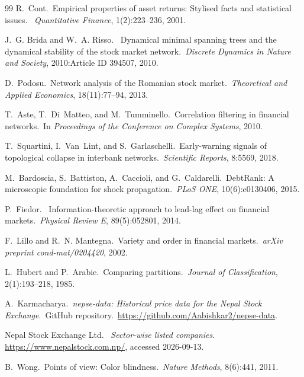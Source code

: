 \documentclass[11pt,a4paper]{article}
\theoremstyle{definition}
\begin{document}
\begin{thebibliography}{99}
 R.~Cont.\ \newblock Empirical properties of
asset returns: Stylised facts and statistical issues.\ \newblock
\emph{Quantitative Finance}, 1(2):223--236, 2001.

 J.~G. Brida and W.~A. Risso.\ \newblock
Dynamical minimal spanning trees and the dynamical stability of the
stock market network.\ \newblock \emph{Discrete Dynamics in Nature
and Society}, 2010:Article ID 394507, 2010.

 D.~Podosu.\ \newblock Network analysis of
the Romanian stock market.\ \newblock \emph{Theoretical and Applied
Economics}, 18(11):77--94, 2013.

 T.~Aste, T.~Di~Matteo, and M.~Tumminello.\
\newblock Correlation filtering in financial networks.\ \newblock In
\emph{Proceedings of the Conference on Complex Systems}, 2010.

 T.~Squartini, I.~Van~\hbox{Lint}, and
S.~Garlaschelli.\ \newblock Early-warning signals of topological
collapse in interbank networks.\ \newblock \emph{Scientific Reports},
8:5569, 2018.

 M.~Bardoscia, S.~Battiston, A.~Caccioli,
and G.~Caldarelli.\ \newblock DebtRank: A microscopic foundation for
shock propagation.\ \newblock \emph{PLoS ONE}, 10(6):e0130406, 2015.

 P.~Fiedor.\ \newblock
Information-theoretic approach to lead-lag effect on financial
markets.\ \newblock \emph{Physical Review E}, 89(5):052801, 2014.

 F.~Lillo and R.~N. Mantegna.\
\newblock Variety and order in financial markets.\ \newblock \emph{arXiv
preprint cond-mat/0204420}, 2002.

 L.~Hubert and P.~Arabie.\ \newblock Comparing
partitions.\ \newblock \emph{Journal of Classification},
2(1):193--218, 1985.

 A.~Karmacharya.\ \newblock \emph{nepse-data:
Historical price data for the Nepal Stock Exchange}.\ \newblock GitHub
repository.\ \url{https://github.com/Aabishkar2/nepse-data}.

 Nepal Stock Exchange Ltd.\ \newblock
\emph{Sector-wise listed companies}.\ \newblock
\url{https://www.nepalstock.com.np/}, accessed 2026-09-13.

 B.~Wong.\ \newblock Points of view: Color
blindness.\ \newblock \emph{Nature Methods}, 8(6):441, 2011.

\end{thebibliography}
\end{document}
